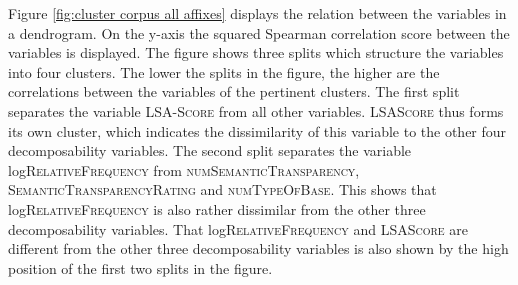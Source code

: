  
 \begin{table}[]

	\caption{Correlation matrix for decomposability measures in corpus study}
	\label{tab: Correlation matrix for all decomposability measures in corpus study}
	

 \end{table}
 
 
 


 

 
  Figure \ref{fig:cluster corpus all affixes} displays the relation between the variables in a dendrogram. On the y-axis the squared Spearman correlation score between the variables is displayed. 
  The figure shows three splits which structure the variables into four clusters. The lower the splits in the figure, the higher are the correlations between the variables of the pertinent clusters.
      The first split separates the  variable \textsc{LSA-Score} from all other variables. \textsc{LSAScore} thus forms its own cluster, which indicates the dissimilarity of this variable to the other four decomposability variables. The second split separates the variable log\textsc{RelativeFrequency} from \textsc{numSemanticTransparency}, \textsc{SemanticTransparencyRating} and \textsc{numTypeOfBase}. This shows that log\textsc{RelativeFrequency} is also rather dissimilar from the other three decomposability variables. 
      That log\textsc{RelativeFrequency} and \textsc{LSAScore} are different from the other three decomposability variables is also shown by the high position of the first two splits in the figure.
      
